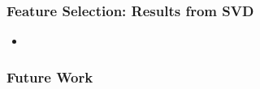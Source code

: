 \documentclass{beamer}
\begin{document}
\begin{frame}

    \frametitle{Feature Selection: Results from SVD}
    \begin{itemize}
        \item
    \end{itemize}

\end{frame}

\begin{frame}

    \frametitle{}

\end{frame}

\begin{frame}

    \frametitle{Future Work}

\end{frame}
\end{document}
